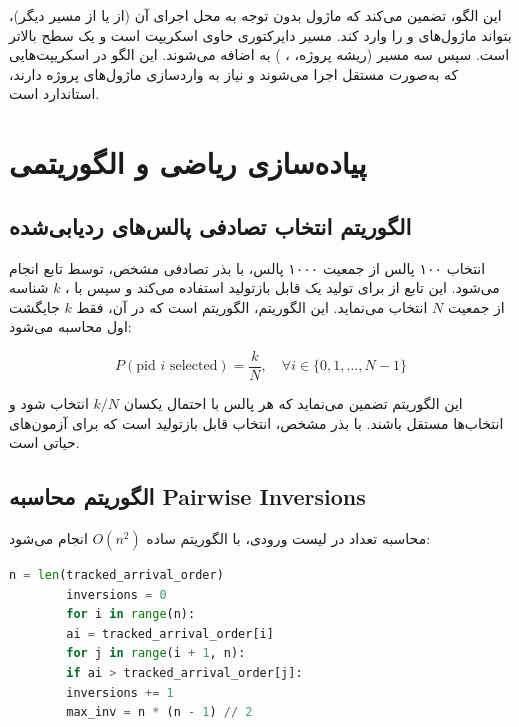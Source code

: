 این الگو، تضمین می‌کند که ماژول بدون توجه به محل اجرای آن (از  یا از مسیر دیگر)، بتواند ماژول‌های  و  را وارد کند.  مسیر دایرکتوری حاوی اسکریپت است و  یک سطح بالاتر است. سپس سه مسیر (ریشه پروژه، ، ) به  اضافه می‌شوند. این الگو در اسکریپت‌هایی که به‌صورت مستقل اجرا می‌شوند و نیاز به واردسازی ماژول‌های پروژه دارند، استاندارد است.

\section{پیاده‌سازی ریاضی و الگوریتمی}

\subsection{الگوریتم انتخاب تصادفی پالس‌های ردیابی‌شده}

انتخاب ۱۰۰ پالس از جمعیت ۱۰۰۰ پالس، با بذر تصادفی مشخص، توسط تابع  انجام می‌شود. این تابع از  برای تولید یک  قابل بازتولید استفاده می‌کند و سپس با ، $k$ شناسه از جمعیت $N$ انتخاب می‌نماید. این الگوریتم، الگوریتم  است که در آن، فقط $k$ جایگشت اول محاسبه می‌شود:

\begin{equation}
	P(\text{pid } i \text{ selected}) = \frac{k}{N}, \quad \forall i \in \{0, 1, \ldots, N-1\}
\end{equation}

این الگوریتم تضمین می‌نماید که هر پالس با احتمال یکسان $k/N$ انتخاب شود و انتخاب‌ها مستقل باشند. با بذر مشخص، انتخاب قابل بازتولید است که برای آزمون‌های  حیاتی است.

\subsection{الگوریتم محاسبه Pairwise Inversions}

محاسبه تعداد  در لیست ورودی، با الگوریتم ساده $O(n^2)$ انجام می‌شود:

\begin{LTR}
	\begin{lstlisting}[language=Python]
		n = len(tracked_arrival_order)
		inversions = 0
		for i in range(n):
		ai = tracked_arrival_order[i]
		for j in range(i + 1, n):
		if ai > tracked_arrival_order[j]:
		inversions += 1
		max_inv = n * (n - 1) // 2
	\end{lstlisting}
\end{LTR}

